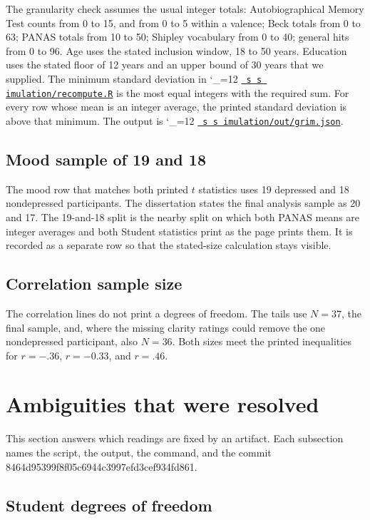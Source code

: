 \documentclass[11pt]{article}
\makeatletter
\newcommand{\proofcommit}{8464d95399f8f05c6944c3997efd3cef934fd861}
\def\ogm@show#1{%
  \ifx\relax#1\else
    #1\allowbreak
    \expandafter\ogm@show
  \fi}
\newcommand{\src}{\begingroup\catcode`\_=12 \ogm@src}
\newcommand{\ogm@src}[1]{%
  \edef\srcurl{https://github.com/alectionary/vibe-math/blob/master/formalization/overgeneral-memory/#1}%
  \href{\srcurl}{\texttt{\ogm@show#1\relax}}\endgroup}
\newcommand{\srcat}{\begingroup\catcode`\_=12 \ogm@srcat}
\newcommand{\ogm@srcat}[2]{%
  \edef\srcurl{https://github.com/alectionary/vibe-math/blob/master/formalization/overgeneral-memory/#1\#L#2}%
  \href{\srcurl}{\texttt{\ogm@show#1\relax}}\endgroup}
\makeatother
\begin{document}
The granularity check assumes the usual integer totals: Autobiographical
Memory Test counts from 0 to 15, and from 0 to 5 within a valence; Beck
totals from 0 to 63; PANAS totals from 10 to 50; Shipley vocabulary from 0
to 40; general hits from 0 to 96.
Age uses the stated inclusion window, 18 to 50 years.
Education uses the stated floor of 12 years and an upper bound of 30 years
that we supplied.
The minimum standard deviation in \srcat{simulation/recompute.R}{111} is the
most equal integers with the required sum.
For every row whose mean is an integer average, the printed standard
deviation is above that minimum.
The output is \src{simulation/out/grim.json}.

\subsection{Mood sample of 19 and 18}

The mood row that matches both printed \(t\) statistics uses 19 depressed
and 18 nondepressed participants.
The dissertation states the final analysis sample as 20 and 17.
The 19-and-18 split is the nearby split on which both PANAS means are
integer averages and both Student statistics print as the page prints them.
It is recorded as a separate row so that the stated-size calculation stays
visible.

\subsection{Correlation sample size}

The correlation lines do not print a degrees of freedom.
The tails use \(N = 37\), the final sample, and, where the missing clarity
ratings could remove the one nondepressed participant, also \(N = 36\).
Both sizes meet the printed inequalities for \(r = -.36\), \(r = -0.33\),
and \(r = .46\).

\section{Ambiguities that were resolved}
\label{sec:resolved}

This section answers which readings are fixed by an artifact.
Each subsection names the script, the output, the command, and the commit
\proofcommit.

\subsection{Student degrees of freedom}
\end{document}
